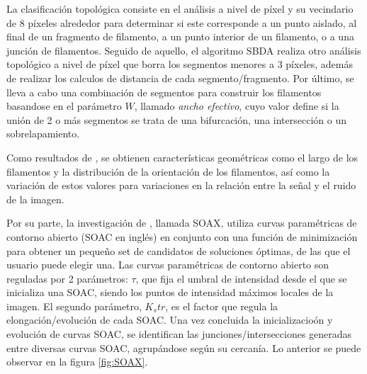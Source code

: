 La clasificaci\'on topol\'ogica consiste en el an\'alisis a nivel de p\'ixel y su vecindario de 8 p\'ixeles alrededor para determinar si este corresponde a un punto aislado, al final de un fragmento de filamento, a un punto interior de un filamento, o a una junci\'on de filamentos. Seguido de aquello, el algoritmo SBDA realiza otro an\'alisis topol\'ogico a nivel de p\'ixel que borra los segmentos menores a 3 p\'ixeles, adem\'as de realizar los calculos de distancia de cada segmento/fragmento. Por último, se lleva a cabo una combinaci\'on de segmentos para construir los filamentos basandose en el par\'ametro $W$, llamado \textit{ancho efectivo}, cuyo valor define si la uni\'on de 2 o m\'as segmentos se trata de una bifurcaci\'on, una intersecci\'on o un sobrelapamiento. 

Como resultados de \cite{qiu2014quantitative}, se obtienen caracter\'isticas geom\'etricas como el largo de los filamentos y la distribuci\'on de la orientaci\'on de los filamentos, as\'i como la variaci\'on de estos valores para variaciones en la relaci\'on entre la se\~nal y el ruido de la imagen.

Por su parte, la investigaci\'on de \cite{xu2015soax}, llamada SOAX, utiliza curvas param\'etricas de contorno abierto (SOAC en ingl\'es) en conjunto con una funci\'on de minimizaci\'on para obtener un peque\~no set de candidatos de soluciones \'optimas, de las que el usuario puede elegir una. Las curvas param\'etricas de contorno abierto son reguladas por 2 par\'ametros: $\tau$, que fija el umbral de intensidad desde el que se inicializa una SOAC, siendo los puntos de intensidad m\'aximos locales de la imagen. El segundo par\'ametro, $K_str$, es el factor que regula la elongaci\'on/evoluci\'on de cada SOAC. Una vez concluida la inicializacio\'on y evoluci\'on de curvas SOAC, se identifican las junciones/intersecciones generadas entre diversas curvas SOAC, agrup\'andose seg\'un su cercan\'ia. Lo anterior se puede observar en la figura \ref{fig:SOAX}.

